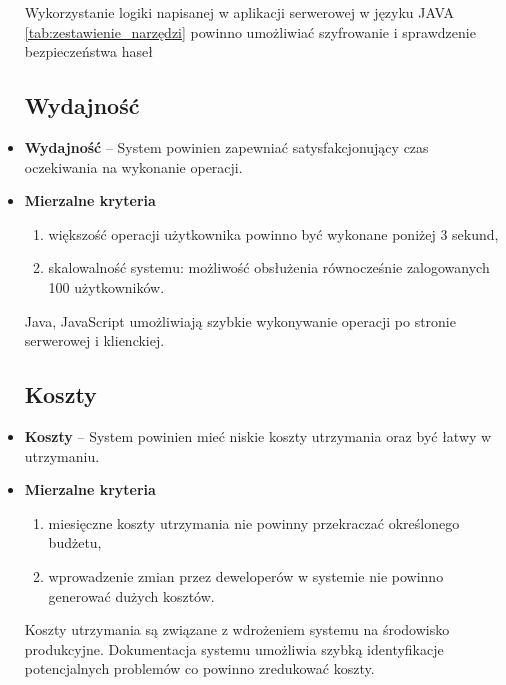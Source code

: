 \begin{itemize}
		Wykorzystanie logiki napisanej w aplikacji serwerowej w języku JAVA \ref{tab:zestawienie_narzędzi} powinno umożliwiać szyfrowanie i sprawdzenie bezpieczeństwa haseł
		
		\subsection{Wydajność}
		\item \textbf{Wydajność} -- System powinien zapewniać satysfakcjonujący czas oczekiwania na wykonanie operacji.
	\item \textbf{Mierzalne kryteria}
		\begin{enumerate}
			\item większość operacji użytkownika powinno być wykonane poniżej 3 sekund,
			\item skalowalność systemu: możliwość obsłużenia równocześnie zalogowanych 100 użytkowników.
		\end{enumerate}
		
		Java, JavaScript umożliwiają szybkie wykonywanie operacji po stronie serwerowej i klienckiej.
		
		\subsection{Koszty}
	\item \textbf{Koszty} -- System powinien mieć niskie koszty utrzymania oraz być łatwy w utrzymaniu.
	\item \textbf{Mierzalne kryteria}
		\begin{enumerate}
			\item miesięczne koszty utrzymania nie powinny przekraczać określonego budżetu,
			\item wprowadzenie zmian przez deweloperów w systemie nie powinno generować dużych kosztów.
		\end{enumerate}
		
	Koszty utrzymania są związane z wdrożeniem systemu na środowisko produkcyjne. Dokumentacja systemu umożliwia szybką identyfikacje potencjalnych problemów co powinno zredukować koszty.
\end{itemize}
 









